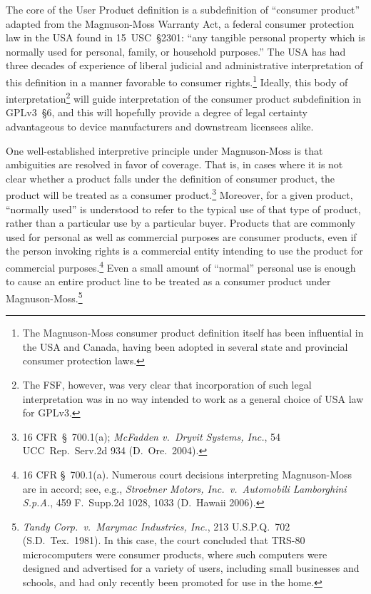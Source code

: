 
The core of the User Product definition is a subdefinition of ``consumer
product'' adapted from the Magnuson-Moss Warranty Act, a federal
consumer protection law in the USA found in 15~USC~\S2301: ``any tangible
personal property which is normally used for personal, family, or household
purposes.''  The USA has had three decades of experience of liberal
judicial and administrative interpretation of this definition in a manner
favorable to consumer rights.\footnote{The Magnuson-Moss consumer product
  definition itself has been influential in the USA and Canada, having been
  adopted in several state and provincial consumer protection laws.}
Ideally, this body of interpretation\footnote{The FSF, however, was very
  clear that incorporation of such legal interpretation was in no way
  intended to work as a general choice of USA law for GPLv3.} will guide
interpretation of the consumer product subdefinition in GPLv3~\S6, and this
will hopefully provide a degree of legal certainty advantageous to device
manufacturers and downstream licensees alike.

One well-established interpretive principle under Magnuson-Moss is that
ambiguities are resolved in favor of coverage.  That is, in cases where
it is not clear whether a product falls under the definition of consumer
product, the product will be treated as a consumer product.\footnote{16
CFR~\S\ 700.1(a); \textit{McFadden v.~Dryvit Systems, Inc.}, 54
UCC~Rep.~Serv.2d 934 (D.~Ore.~2004).}  Moreover, for a given product,
``normally used'' is understood to refer to the typical use of that type
of product, rather than a particular use by a particular buyer.
Products that are commonly used for personal as well as commercial
purposes are consumer products, even if the person invoking rights is a
commercial entity intending to use the product for commercial
purposes.\footnote{16 CFR \S \ 700.1(a).  Numerous court decisions
interpreting Magnuson-Moss are in accord; see, e.g., \textit{Stroebner
Motors, Inc.~v.~Automobili Lamborghini S.p.A.}, 459 F.~Supp.2d 1028,
1033 (D.~Hawaii 2006).}  Even a small amount of ``normal'' personal use
is enough to cause an entire product line to be treated as a consumer
product under Magnuson-Moss.\footnote{\textit{Tandy Corp.~v.~Marymac
Industries, Inc.}, 213 U.S.P.Q.~702 (S.D.~Tex.~1981). In this case, the
court concluded that TRS-80 microcomputers were consumer products, where
such computers were designed and advertised for a variety of users,
including small businesses and schools, and had only recently been
promoted for use in the home.}

